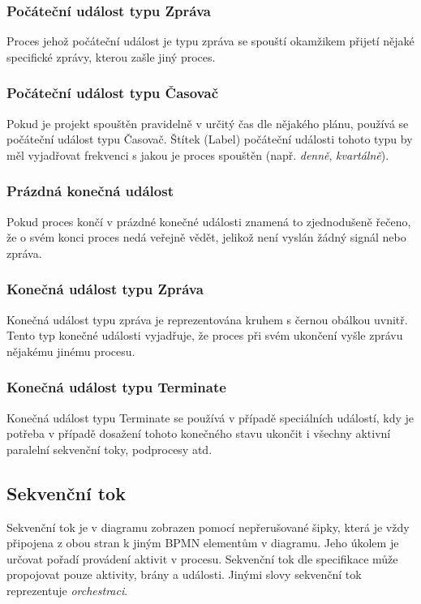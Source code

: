 \documentclass[]{article}
\begin{document}
\subsubsection{Počáteční událost typu Zpráva}
Proces jehož počáteční událost je typu zpráva se spouští okamžikem přijetí nějaké specifické zprávy, kterou zašle jiný proces.

\subsubsection{Počáteční událost typu Časovač}
Pokud je projekt spouštěn pravidelně v určitý čas dle nějakého plánu, používá se počáteční událost typu Časovač. Štítek (Label) počáteční události tohoto typu by měl vyjadřovat frekvenci s jakou je proces spouštěn (např. \textit{denně}, \textit{kvartálně}).

\subsubsection{Prázdná konečná událost}
Pokud proces končí v prázdné konečné události znamená to zjednodušeně řečeno, že o svém konci proces nedá veřejně vědět, jelikož není vyslán žádný signál nebo zpráva.

\subsubsection{Konečná událost typu Zpráva}
Konečná událost typu zpráva je reprezentována kruhem s černou obálkou uvnitř. Tento typ konečné události vyjadřuje, že proces při svém ukončení vyšle zprávu nějakému jinému procesu.

\subsubsection{Konečná událost typu Terminate}
Konečná událost typu Terminate se používá v případě speciálních událostí, kdy je potřeba v případě dosažení tohoto konečného stavu ukončit i všechny aktivní paralelní sekvenční toky, podprocesy atd.

\subsection{Sekvenční tok}
Sekvenční tok je v diagramu zobrazen pomocí nepřerušované šipky, která je vždy připojena z obou stran k jiným BPMN elementům v diagramu. Jeho úkolem je určovat pořadí provádení aktivit v procesu. Sekvenční tok dle specifikace může propojovat pouze aktivity, brány a události. Jinými slovy sekvenční tok reprezentuje \textit{orchestraci}. \cite{Silver2011}
\end{document}
